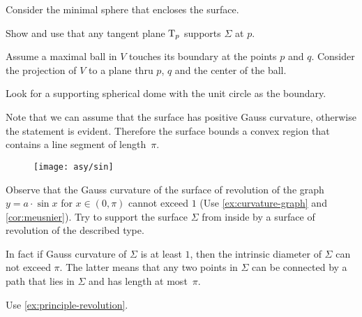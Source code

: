 



Consider the minimal sphere that encloses the surface.

 Show and use that any tangent plane $\mathrm{T}_p$ supports $\Sigma$ at $p$.

Assume a maximal ball in $V$ touches its boundary at the points $p$ and $q$.
Consider the projection of $V$ to a plane thru $p$, $q$ and the center of the ball. 


Look for a supporting spherical dome with the unit circle as the boundary.

Note that we can assume that the surface has positive Gauss curvature, otherwise the statement is evident.
Therefore the surface bounds a convex region that contains a line segment of length~$\pi$.

\begin{figure}[h!]
\vskip-0mm
\centering
\texttt{[image: asy/sin]}
\vskip-0mm
\end{figure}

Observe that the Gauss curvature of the surface of revolution of the graph $y=a\cdot \sin x$ for $x\in(0,\pi)$ cannot exceed $1$ (Use \ref{ex:curvature-graph} and \ref{cor:meusnier}).
Try to support the surface $\Sigma$ from inside by a surface of revolution of the described type. 

In fact if Gauss curvature of $\Sigma$ is at least $1$,
then
the intrinsic diameter of $\Sigma$ can not exceed $\pi$.
The latter means that any two points in $\Sigma$ can be connected by a path that lies in $\Sigma$ and has length at most~$\pi$.







 Use \ref{ex:principle-revolution}.


